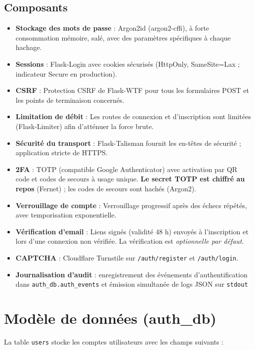 \subsection{Composants}
\begin{itemize}
  \item \textbf{Stockage des mots de passe} : Argon2id (argon2-cffi), à forte consommation mémoire, salé, avec des paramètres spécifiques à chaque hachage.
  \item \textbf{Sessions} : Flask-Login avec cookies sécurisés (HttpOnly, SameSite=Lax ; indicateur Secure en production).
  \item \textbf{CSRF} : Protection CSRF de Flask-WTF pour tous les formulaires POST et les points de terminaison concernés.
  \item \textbf{Limitation de débit} : Les routes de connexion et d'inscription sont limitées (Flask-Limiter) afin d'atténuer la force brute.
  \item \textbf{Sécurité du transport} : Flask-Talisman fournit les en-têtes de sécurité ; application stricte de HTTPS.
  \item \textbf{2FA} : TOTP (compatible Google Authenticator) avec activation par QR code et codes de secours à usage unique. \textbf{Le secret TOTP est chiffré au repos} (Fernet) ; les codes de secours sont hachés (Argon2).
  \item \textbf{Verrouillage de compte} : Verrouillage progressif après des échecs répétés, avec temporisation exponentielle.
  \item \textbf{Vérification d'email} : Liens signés (validité 48 h) envoyés à l'inscription et lors d'une connexion non vérifiée. La vérification est \emph{optionnelle par défaut}.
  \item \textbf{CAPTCHA} : Cloudflare Turnstile sur \texttt{/auth/register} et \texttt{/auth/login}.
  \item \textbf{Journalisation d'audit} : enregistrement des événements d'authentification dans \texttt{auth\_db.auth\_events} et émission simultanée de logs JSON sur \texttt{stdout}
\end{itemize}

\section{Modèle de données (auth\_db)}
La table \texttt{users} stocke les comptes utilisateurs avec les champs suivants :

